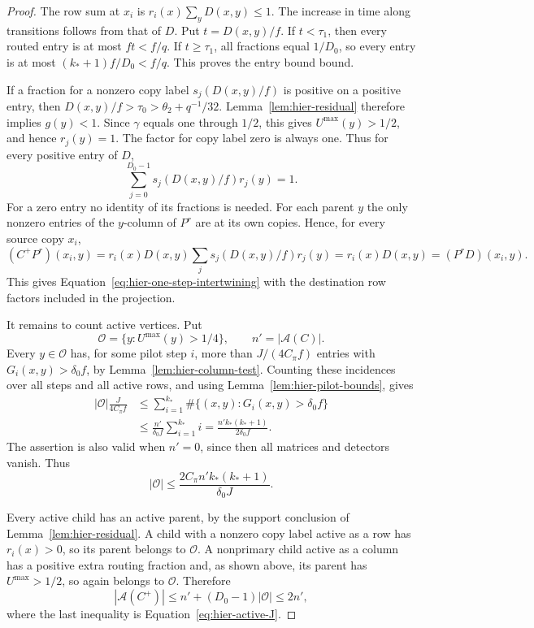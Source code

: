 \begin{proof}
The row sum at $x_i$ is $r_i(x)\sum_yD(x,y)\leq1$.  The increase in time along transitions follows from that of $D$.  Put $t=D(x,y)/f$.  If
$t<\tau_1$, then every routed entry is at most $ft<f/q$.  If
$t\geq\tau_1$, all fractions equal $1/D_0$, so every entry is at
most $(k_*+1)f/D_0<f/q$.  This proves the entry bound bound.

If a fraction for a nonzero copy label $s_j(D(x,y)/f)$ is positive on a positive
entry, then $D(x,y)/f>\tau_0>\theta_2+q^{-1}/32$.
Lemma~\ref{lem:hier-residual} therefore implies $g(y)<1$.
Since $\gamma$ equals one through $1/2$, this gives
$U^{\max}(y)>1/2$, and hence $r_j(y)=1$.  The factor for copy label zero is
always one.  Thus for every positive entry of $D$,
\begin{equation}
 \sum_{j=0}^{D_0-1}s_j(D(x,y)/f)r_j(y)=1.
 \label{eq:hier-routing-projects}
\end{equation}
For a zero entry no identity of its fractions is needed. For each
parent $y$ the only nonzero entries of the $y$-column of $P^r$ are
at its own copies. Hence, for every source copy $x_i$,
\[
 (C^+P^r)(x_i,y)
 =r_i(x)D(x,y)\sum_j s_j(D(x,y)/f)r_j(y)
 =r_i(x)D(x,y)=(P^rD)(x_i,y).
\]
This gives Equation~\eqref{eq:hier-one-step-intertwining} with the
destination row factors included in the projection.

It remains to count active vertices.  Put
\[
 \mathcal O=\{y:U^{\max}(y)>1/4\},\qquad
 n'=|\mathcal A(C)|.
\]
Every $y\in\mathcal O$ has, for some pilot step $i$, more than
$J/(4C_\pi f)$ entries with $G_i(x,y)>\delta_0f$, by
Lemma~\ref{lem:hier-column-test}.  Counting these incidences over all
steps and all active rows, and using
Lemma~\ref{lem:hier-pilot-bounds}, gives
\begin{align*}
 |\mathcal O|\frac{J}{4C_\pi f}
 &\leq\sum_{i=1}^{k_*}\#\{(x,y):G_i(x,y)>\delta_0f\}\\
 &\leq\frac{n'}{\delta_0f}\sum_{i=1}^{k_*}i
   =\frac{n'k_*(k_*+1)}{2\delta_0f}.
\end{align*}
The assertion is also valid when $n'=0$, since then all matrices and
detectors vanish.  Thus
\[
 |\mathcal O|\leq
       \frac{2C_\pi n'k_*(k_*+1)}{\delta_0J}.
\]

Every active child has an active parent, by the support conclusion of
Lemma~\ref{lem:hier-residual}.  A child with a nonzero copy label active as a row has
$r_i(x)>0$, so its parent belongs to $\mathcal O$.  A nonprimary
child active as a column has a positive extra routing fraction and, as
shown above, its parent has $U^{\max}>1/2$, so again belongs to
$\mathcal O$.  Therefore
\[
 |\mathcal A(C^+)|\leq n'+(D_0-1)|\mathcal O|\leq2n',
\]
where the last inequality is Equation~\eqref{eq:hier-active-J}.
\end{proof}

